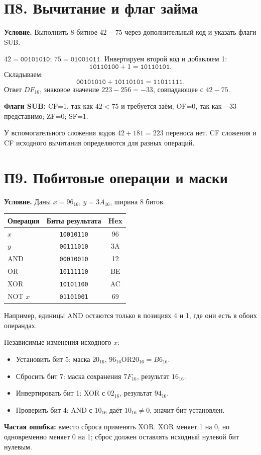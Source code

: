 \section{П8. Вычитание и флаг займа}\label{ex:p8}
\textbf{Условие.} Выполнить 8-битное $42-75$ через дополнительный код и указать флаги SUB.

$42=\texttt{00101010}$; $75=\texttt{01001011}$. Инвертируем второй код и добавляем 1:
\[
\texttt{10110100}+1=\texttt{10110101}.
\]
Складываем:
\[
\texttt{00101010}+\texttt{10110101}=\texttt{11011111}.
\]
Ответ $DF_{16}$, знаковое значение $223-256=-33$, совпадающее с $42-75$.

\textbf{Флаги SUB:} CF=1, так как $42<75$ и требуется заём; OF=0, так как $-33$ представимо; ZF=0; SF=1.

У вспомогательного сложения кодов $42+181=223$ переноса нет. CF сложения и CF исходного вычитания определяются для разных операций.

\section{П9. Побитовые операции и маски}\label{ex:p9}
\textbf{Условие.} Даны $x=96_{16}$, $y=3A_{16}$, ширина 8 битов.
\begin{center}
\begin{tabular}{l|c|c}
Операция & Биты результата & Hex\\\hline
$x$ & \texttt{10010110} & 96\\
$y$ & \texttt{00111010} & 3A\\
AND & \texttt{00010010} & 12\\
OR & \texttt{10111110} & BE\\
XOR & \texttt{10101100} & AC\\
NOT $x$ & \texttt{01101001} & 69
\end{tabular}
\end{center}
Например, единицы AND остаются только в позициях 4 и 1, где они есть в обоих операндах.

Независимые изменения исходного $x$:
\begin{itemize}
    \item Установить бит 5: маска $20_{16}$, $96_{16}\mathbin{\mathrm{OR}}20_{16}=B6_{16}$.
    \item Сбросить бит 7: маска сохранения $7F_{16}$, результат $16_{16}$.
    \item Инвертировать бит 1: XOR с $02_{16}$, результат $94_{16}$.
    \item Проверить бит 4: AND с $10_{16}$ даёт $10_{16}\ne0$, значит бит установлен.
\end{itemize}
\textbf{Частая ошибка:} вместо сброса применять XOR. XOR меняет 1 на 0, но одновременно меняет 0 на 1; сброс должен оставлять исходный нулевой бит нулевым.


